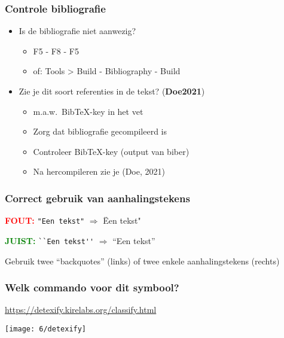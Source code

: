 \documentclass[aspectratio=169]{beamer}
\begin{document}
\begin{frame}
  \frametitle{Controle bibliografie}

  \begin{itemize}
    \item Is de bibliografie niet aanwezig?
          \begin{itemize}
            \item F5 - F8 - F5
            \item of: Tools > Build - Bibliography - Build
          \end{itemize}
    \item Zie je dit soort referenties in de tekst? (\textbf{Doe2021})
          \begin{itemize}
            \item m.a.w.~Bib{\TeX}-key in het vet
            \item Zorg dat bibliografie gecompileerd is
            \item Controleer Bib{\TeX}-key (output van biber)
            \item Na hercompileren zie je (Doe, 2021)
          \end{itemize}
  \end{itemize}

\end{frame}

\begin{frame}[fragile]
  \frametitle{Correct gebruik van aanhalingstekens}

  \textcolor{red}{\textbf{FOUT:}} \verb|"Een tekst"| $\Rightarrow$ \"Een tekst"

  \bigskip

  \textcolor{green}{\textbf{JUIST:}} \verb|``Een tekst''| $\Rightarrow$ ``Een tekst''

  \bigskip

  Gebruik twee ``backquotes'' (links) of twee enkele aanhalingstekens (rechts)
\end{frame}

\begin{frame}
  \frametitle{Welk commando voor dit symbool?}

  \url{https://detexify.kirelabs.org/classify.html}

  \centering
  \texttt{[image: 6/detexify]}

\end{frame}
\end{document}
